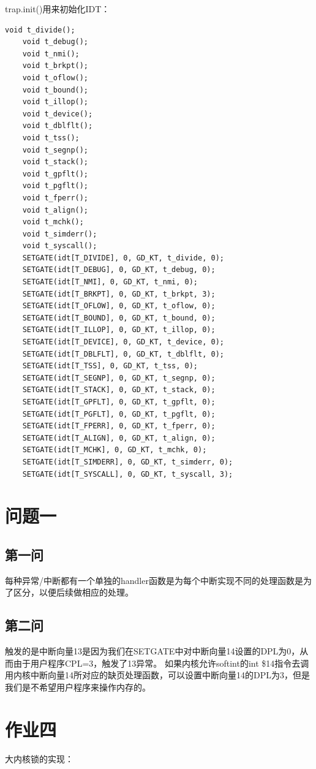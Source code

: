 \documentclass[12pt,a4paper,UTF8]{article}
\begin{document}
    trap.init()用来初始化IDT：
    \begin{lstlisting}[style=CPP]
    void t_divide();
    void t_debug();
    void t_nmi();
    void t_brkpt();
    void t_oflow();
    void t_bound();
    void t_illop();
    void t_device();
    void t_dblflt();
    void t_tss();
    void t_segnp();
    void t_stack();
    void t_gpflt();
    void t_pgflt();
    void t_fperr();
    void t_align();
    void t_mchk();
    void t_simderr();
    void t_syscall();
    SETGATE(idt[T_DIVIDE], 0, GD_KT, t_divide, 0);
    SETGATE(idt[T_DEBUG], 0, GD_KT, t_debug, 0);
    SETGATE(idt[T_NMI], 0, GD_KT, t_nmi, 0);
    SETGATE(idt[T_BRKPT], 0, GD_KT, t_brkpt, 3);
    SETGATE(idt[T_OFLOW], 0, GD_KT, t_oflow, 0);
    SETGATE(idt[T_BOUND], 0, GD_KT, t_bound, 0);
    SETGATE(idt[T_ILLOP], 0, GD_KT, t_illop, 0);
    SETGATE(idt[T_DEVICE], 0, GD_KT, t_device, 0);
    SETGATE(idt[T_DBLFLT], 0, GD_KT, t_dblflt, 0);
    SETGATE(idt[T_TSS], 0, GD_KT, t_tss, 0);
    SETGATE(idt[T_SEGNP], 0, GD_KT, t_segnp, 0);
    SETGATE(idt[T_STACK], 0, GD_KT, t_stack, 0);
    SETGATE(idt[T_GPFLT], 0, GD_KT, t_gpflt, 0);
    SETGATE(idt[T_PGFLT], 0, GD_KT, t_pgflt, 0);
    SETGATE(idt[T_FPERR], 0, GD_KT, t_fperr, 0);
    SETGATE(idt[T_ALIGN], 0, GD_KT, t_align, 0);
    SETGATE(idt[T_MCHK], 0, GD_KT, t_mchk, 0);
    SETGATE(idt[T_SIMDERR], 0, GD_KT, t_simderr, 0);
    SETGATE(idt[T_SYSCALL], 0, GD_KT, t_syscall, 3);
    \end{lstlisting}
\section{问题一}
    \subsection{第一问}
    每种异常/中断都有一个单独的handler函数是为每个中断实现不同的处理函数是为了区分，以便后续做相应的处理。

    \subsection{第二问}
    触发的是中断向量13是因为我们在SETGATE中对中断向量14设置的DPL为0，从而由于用户程序CPL=3，触发了13异常。
    如果内核允许softint的int \$14指令去调用内核中断向量14所对应的缺页处理函数，可以设置中断向量14的DPL为3，但是我们是不希望用户程序来操作内存的。

\section{作业四}
    大内核锁的实现：
\end{document}
